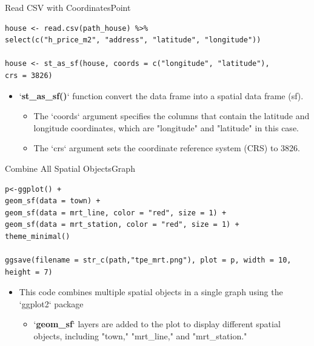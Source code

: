 \documentclass[dvipsnames,hyperref={pdfpagelabels=false}]{beamer}
\begin{document}
\begin{frame}[fragile]{Read CSV with Coordinates}{Point}
\begin{lstlisting}
house <- read.csv(path_house) %>% 
select(c("h_price_m2", "address", "latitude", "longitude"))

house <- st_as_sf(house, coords = c("longitude", "latitude"), 
crs = 3826)
\end{lstlisting}
\begin{itemize}
	
	\item  `\textbf{st\_as\_sf()}` function convert the data frame into a spatial data frame (sf).
	\vspace{0.2cm}
	\begin{itemize}
		\item The `coords` argument specifies the columns that contain the latitude and longitude coordinates, which are "longitude" and "latitude" in this case.
			\vspace{0.2cm}
		\item The `crs` argument sets the coordinate reference system (CRS) to 3826.
	\end{itemize}
\end{itemize}
\end{frame}








\begin{frame}[fragile]{Combine All Spatial Objects}{Graph}
	
\begin{lstlisting}
p<-ggplot() + 
geom_sf(data = town) +
geom_sf(data = mrt_line, color = "red", size = 1) +
geom_sf(data = mrt_station, color = "red", size = 1) +
theme_minimal()

ggsave(filename = str_c(path,"tpe_mrt.png"), plot = p, width = 10, height = 7)
\end{lstlisting}
	\begin{itemize}
		
		\item This code combines multiple spatial objects in a single graph using the `ggplot2` package
		\vspace{0.2cm}
		\begin{itemize}
			\item `\textbf{geom\_sf}` layers are added to the plot to display different spatial objects, including "town," "mrt\_line," and "mrt\_station."				
		\end{itemize}
		
	\end{itemize}
\end{frame}
\end{document}
